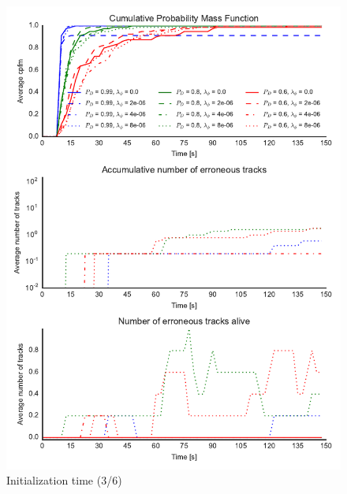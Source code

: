 \begin{figure}
\centering
\includegraphics{Figures/plots/Scenario0_Init-Time(3-6).pdf}
\caption{Initialization time (3/6)}\label{fig:init_time_3-6}
\end{figure}
